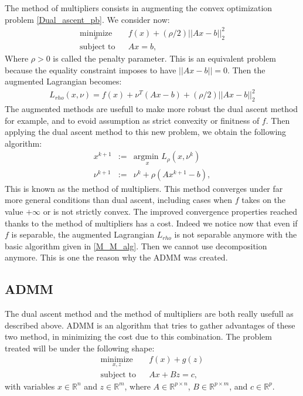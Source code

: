 \itshape\documentclass{article}
\begin{document}
	The method of multipliers consists in augmenting the convex optimization problem \ref{Dual_ascent_pb}. We consider now:
\begin{eqnarray}
\label{M_M_pb}
\underset{x}{\text{minimize}} & & f(x) +(\rho/2)||Ax - b||_2^2 \\
\text{subject to} & & Ax = b, \nonumber
\end{eqnarray}
Where $\rho > 0$ is called the penalty parameter. This is an equivalent problem because the equality constraint imposes to have $||Ax - b|| = 0$. Then the augmented Lagrangian becomes:
\begin{eqnarray*}
L_{rho}(x,\nu) = f(x) + \nu^T(Ax - b) + (\rho/2)||Ax - b||_2^2
\end{eqnarray*}
The augmented methods are usefull to make more robust the dual ascent method for example, and to evoid assumption as strict convexity or finitness of $f$. Then applying the dual ascent method to this new problem, we obtain the following algorithm:
\begin{eqnarray}
\label{M_M_alg}
x^{k+1} &:=& \underset{x}{\text{argmin }} L_{\rho}(x, \nu^k) \\
\nu^{k+1} &:=& \nu^k + \rho (A x^{k+1} - b),
\end{eqnarray}
This is known as the method of multipliers. This method converges under far more general conditions than dual ascent, including cases when $f$ takes on the value $+ \infty$ or is not strictly convex. 
The improved convergence properties reached thanks to the method of multipliers has a cost. Indeed we notice now that even if $f$ is separable, the augmented Lagrangian $L_{rho}$ is not separable anymore with the basic algorithm given in \ref{M_M_alg}. Then we cannot use decomposition anymore. This is one the reason why the ADMM was created.


\subsection{ADMM}
	\label{ADMM}
	
	The dual ascent method and the method of multipliers are both really usefull as described above. ADMM is an algorithm that tries to gather advantages of these two method, in minimizing the cost due to this combination. The problem treated will be under the following shape:
\begin{eqnarray}
\label{ADMM_pb}
\underset{x,z}{\text{minimize}} & & f(x) + g(z) \\
\text{subject to} & & Ax + Bz = c, \nonumber
\end{eqnarray}	
with variables $x \in \mathbb{R}^n$ and $z \in \mathbb{R}^m$, where $A \in \mathbb{R}^{p \times n}$, $B \in \mathbb{R}^{p \times m}$, and $c \in \mathbb{R}^{p}$.

 
 

\clearpage
\end{document}
